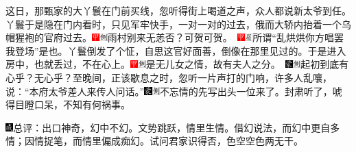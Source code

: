 这日，那甄家的大丫鬟在门前买线，忽听得街上喝道之声，众人都说新太爷到任。丫鬟于是隐在门内看时，只见军牢快手，一对一对的过去，俄而大轿内抬着一个乌帽猩袍的官府过去。{\includegraphics[width=3mm]{../Images/00002}\includegraphics[width=3mm]{../Images/00011}\footnotesize \kaishu 雨村别来无恙否？可贺可贺。　\includegraphics[width=3mm]{../Images/00002}\includegraphics[width=3mm]{../Images/00010}\footnotesize \kaishu 所谓``乱烘烘你方唱罢我登场''是也。}丫鬟倒发了个怔，自思这官好面善，倒像在那里见过的。于是进入房中，也就丢过，不在心上。{{\includegraphics[width=3mm]{../Images/00002}\includegraphics[width=3mm]{../Images/00011}\footnotesize \kaishu 是无儿女之情，故有夫人之分。　}\includegraphics[width=3mm]{../Images/00006}\includegraphics[width=3mm]{../Images/00011}\footnotesize \kaishu 起初到底有心乎？无心乎？}至晚间，正该歇息之时，忽听一片声打的门响，许多人乱嚷，说：``本府太爷差人来传人问话。''{\includegraphics[width=3mm]{../Images/00006}\includegraphics[width=3mm]{../Images/00011}\footnotesize \kaishu 不忘情的先写出头一位来了。}封肃听了，唬得目瞪口呆，不知有何祸事。

{\includegraphics[width=3mm]{../Images/00005}\kaishu 总评：出口神奇，幻中不幻。文势跳跃，情里生情。借幻说法，而幻中更自多情；因情捉笔，而情里偏成痴幻。试问君家识得否，色空空色两无干。}

